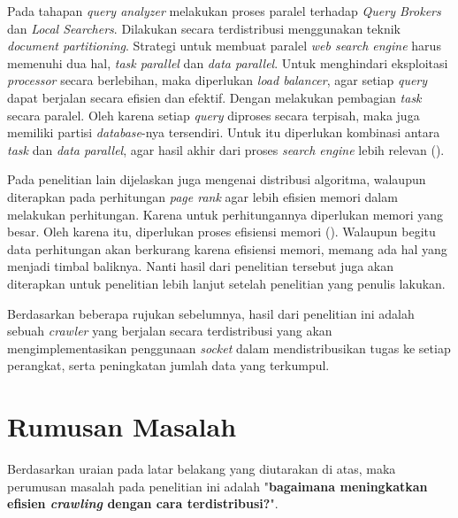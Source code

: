 
Pada tahapan \emph{query analyzer} melakukan proses paralel terhadap \emph{Query Brokers} dan \emph{Local Searchers}. Dilakukan secara terdistribusi menggunakan teknik \emph{document partitioning}. Strategi untuk membuat paralel \emph{web search engine} harus memenuhi dua hal, \emph{task parallel} dan \emph{data parallel}. Untuk menghindari eksploitasi \emph{processor} secara berlebihan, maka diperlukan \emph{load balancer}, agar setiap \emph{query} dapat berjalan secara efisien dan efektif. Dengan melakukan pembagian \emph{task} secara paralel. Oleh karena setiap \emph{query} diproses secara terpisah, maka juga memiliki partisi \emph{database}-nya tersendiri. Untuk itu diperlukan kombinasi antara \emph{task} dan \emph{data parallel}, agar hasil akhir dari proses \emph{search engine} lebih relevan (\cite{orlando2002design}).

Pada penelitian lain dijelaskan juga mengenai distribusi algoritma, walaupun diterapkan pada perhitungan \emph{page rank} agar lebih efisien memori dalam melakukan perhitungan. Karena untuk perhitungannya diperlukan memori yang besar. Oleh karena itu, diperlukan proses efisiensi memori (\cite{farhan2023page}). Walaupun begitu data perhitungan akan berkurang karena efisiensi memori, memang ada hal yang menjadi timbal baliknya. Nanti hasil dari penelitian tersebut juga akan diterapkan untuk penelitian lebih lanjut setelah penelitian yang penulis lakukan.

Berdasarkan beberapa rujukan sebelumnya, hasil dari penelitian ini adalah sebuah \emph{crawler} yang berjalan secara terdistribusi yang akan mengimplementasikan penggunaan \emph{socket} dalam mendistribusikan tugas ke setiap perangkat, serta peningkatan jumlah data yang terkumpul.


\section{Rumusan Masalah}
Berdasarkan uraian pada latar belakang yang diutarakan di atas, maka perumusan masalah pada penelitian ini adalah "\textbf{bagaimana meningkatkan efisien \emph{crawling} dengan cara terdistribusi?}".

